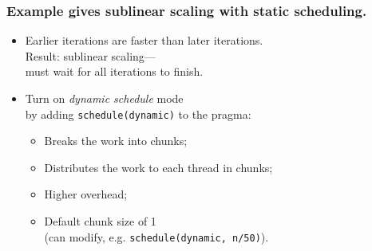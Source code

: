 \begin{frame}[fragile]
  \frametitle{Example gives sublinear scaling with static scheduling.}

\large


  \begin{changemargin}{1cm}
  \begin{itemize}
    \item Earlier iterations are faster than later iterations.\\
          Result: sublinear scaling---\\ must wait for all iterations to finish.\\[1em]
    \item Turn on \emph{dynamic schedule} mode\\ by adding
      {\tt schedule(dynamic)} to the pragma:
      \begin{itemize}
        \item Breaks the work into chunks;
        \item Distributes the work to each thread in chunks;
        \item Higher overhead;
        \item Default chunk size of 1\\ (can modify, e.g. {\tt schedule(dynamic, n/50)}).
      \end{itemize}
  \end{itemize}
  \end{changemargin}


\end{frame}

